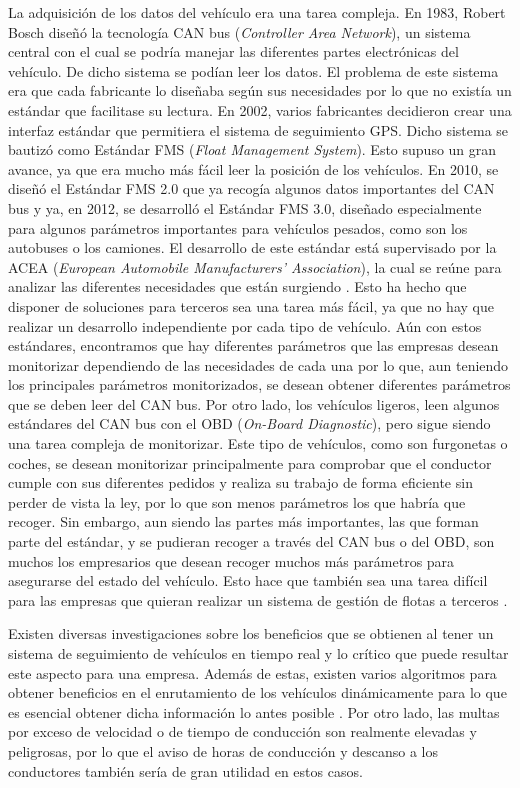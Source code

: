 La adquisición de los datos del vehículo era una tarea compleja. En
1983, Robert Bosch diseñó la tecnología CAN bus (\emph{Controller Area
  Network}), un sistema central con el cual se podría manejar las
diferentes partes electrónicas del vehículo. De dicho sistema se
podían leer los datos. El problema de este sistema era que cada
fabricante lo diseñaba según sus necesidades por lo que no existía un
estándar que facilitase su lectura. En 2002, varios fabricantes
decidieron crear una interfaz estándar que permitiera el sistema de
seguimiento GPS. Dicho sistema se bautizó como Estándar FMS
(\emph{Float Management System}). Esto supuso un gran avance, ya que
era mucho más fácil leer la posición de los vehículos. En 2010, se
diseñó el Estándar FMS 2.0 que ya recogía algunos datos importantes
del CAN bus y ya, en 2012, se desarrolló el Estándar FMS 3.0, diseñado
especialmente para algunos parámetros importantes para vehículos
pesados, como son los autobuses o los camiones. El desarrollo de este
estándar está supervisado por la ACEA (\emph{European Automobile
  Manufacturers’ Association}), la cual se reúne para analizar las
diferentes necesidades que están surgiendo \cite{2-1}. Esto ha hecho
que disponer de soluciones para terceros sea una tarea más fácil, ya
que no hay que realizar un desarrollo independiente por cada tipo de
vehículo. Aún con estos estándares, encontramos que hay diferentes
parámetros que las empresas desean monitorizar dependiendo de las
necesidades de cada una por lo que, aun teniendo los principales
parámetros monitorizados, se desean obtener diferentes parámetros que
se deben leer del CAN bus. Por otro lado, los vehículos ligeros, leen
algunos estándares del CAN bus con el OBD (\emph{On-Board
  Diagnostic}), pero sigue siendo una tarea compleja de monitorizar.
Este tipo de vehículos, como son furgonetas o coches, se desean
monitorizar principalmente para comprobar que el conductor cumple con
sus diferentes pedidos y realiza su trabajo de forma eficiente sin
perder de vista la ley, por lo que son menos parámetros los que habría
que recoger. Sin embargo, aun siendo las partes más importantes, las
que forman parte del estándar, y se pudieran recoger a través del CAN
bus o del OBD, son muchos los empresarios que desean recoger muchos
más parámetros para asegurarse del estado del vehículo. Esto hace que
también sea una tarea difícil para las empresas que quieran realizar
un sistema de gestión de flotas a terceros \cite{2-2}.

Existen diversas investigaciones sobre los beneficios que se obtienen
al tener un sistema de seguimiento de vehículos en tiempo real y lo
crítico que puede resultar este aspecto para una empresa. Además de
estas, existen varios algoritmos para obtener beneficios en el
enrutamiento de los vehículos dinámicamente para lo que es esencial
obtener dicha información lo antes posible \cite{1-1-4}. Por otro
lado, las multas por exceso de velocidad \cite{1-1-5} o de tiempo de
conducción \cite{1-1-6} son realmente elevadas y peligrosas, por lo
que el aviso de horas de conducción y descanso a los conductores
también sería de gran utilidad en estos casos.

